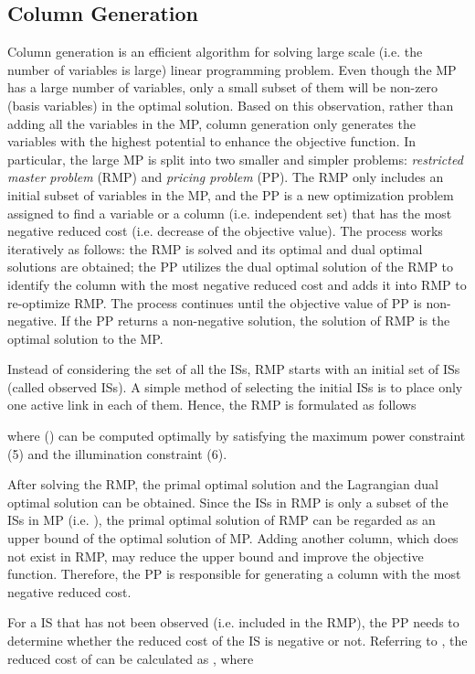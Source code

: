 \documentclass[10pt,journal]{IEEEtran}
\begin{document}
\subsection{Column Generation}
Column generation \cite{bertsimas1997introduction} is an efficient algorithm for solving large scale (i.e. the number of variables is large) linear programming problem. Even though the MP has a large number of variables, only a small subset of them will be non-zero (basis variables) in the optimal solution. Based on this observation, rather than adding all the variables in the MP, column generation only generates the variables with the highest potential to enhance the objective function. In particular, the large MP is split into two smaller and simpler problems: {\it restricted master problem} (RMP) and {\it pricing problem} (PP). The RMP only includes an initial subset of variables in the MP, and the PP is a new optimization problem assigned to find a variable or a column (i.e. independent set) that has the most negative reduced cost (i.e. decrease of the objective value). The process works iteratively as follows: the RMP is solved and its optimal and dual optimal solutions are obtained; the PP utilizes the dual optimal solution of the RMP to identify the column with the most negative reduced cost and adds it into RMP to re-optimize RMP. The process continues until the objective value of PP is non-negative. If the PP returns a non-negative solution, the solution of RMP is the optimal solution to the MP.

Instead of considering the set  of all the ISs, RMP starts with an initial set  of ISs (called observed ISs). A simple method of selecting the initial ISs is to place only one active link in each of them. Hence, the RMP is formulated as follows

where  () can be computed optimally by satisfying the maximum power constraint (5) and the illumination constraint (6).

After solving the RMP, the primal optimal solution and the Lagrangian dual optimal solution can be obtained. Since the ISs in RMP is only a subset of the ISs in MP (i.e. ), the primal optimal solution of RMP can be regarded as an upper bound of the optimal solution of MP. Adding another column, which does not exist in RMP, may reduce the upper bound and improve the objective function. Therefore, the PP is responsible for generating a column with the most negative reduced cost.

For a IS that has not been observed (i.e. included in the RMP), the PP needs to determine whether the reduced cost of the IS is negative or not. Referring to \cite{bertsimas1997introduction}, the reduced cost of  can be calculated as , where
\end{document}
